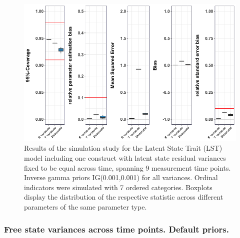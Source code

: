  \begin{figure}[H]
 \begin{adjustwidth}{-1cm}{-1cm}
    \begin{center}
  \includegraphics[width=1\textwidth]{Boxplot_LST_fixed_IGprior.png}
   \end{center}
    \end{adjustwidth}
      \captionsetup{skip=10pt,width=1.05\textwidth}
\caption[Results LST fixed variance IG]{Results of the simulation study for the Latent State Trait (LST) model including one construct with latent state residual variances fixed to be equal across time, spanning 9 measurement time points. Inverse gamma priors IG(0.001,0.001) for all variances. Ordinal indicators were simulated with 7 ordered categories. Boxplots display the distribution of the respective statistic across different parameters of the same parameter type.}
\label{Fig: LST one fixed IG}
\end{figure}


  \subsubsection{Free state variances across time points. Default priors.}


